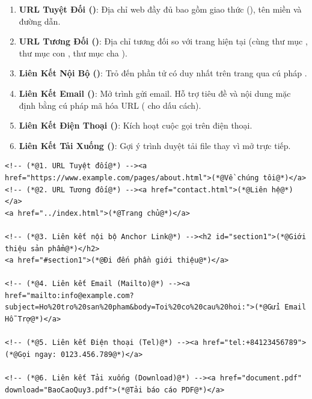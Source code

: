 \begin{enumerate}
    \item \textbf{URL Tuyệt Đối ()}: Địa chỉ web đầy đủ bao gồm giao thức (), tên miền và đường dẫn.
    \item \textbf{URL Tương Đối ()}: Địa chỉ tương đối so với trang hiện tại (cùng thư mục , thư mục con , thư mục cha ).
    \item \textbf{Liên Kết Nội Bộ ()}: Trỏ đến phần tử có  duy nhất trên trang qua cú pháp .
    \item \textbf{Liên Kết Email ()}: Mở trình gửi email. Hỗ trợ tiêu đề và nội dung mặc định bằng cú pháp mã hóa URL ( cho dấu cách).
    \item \textbf{Liên Kết Điện Thoại ()}: Kích hoạt cuộc gọi trên điện thoại.
    \item \textbf{Liên Kết Tải Xuống ()}: Gợi ý trình duyệt tải file thay vì mở trực tiếp.
\end{enumerate}

\begin{codeWindow}
\begin{lstlisting}[language=HTML5]
<!-- (*@1. URL Tuyệt đối@*) --><a href="https://www.example.com/pages/about.html">(*@Về chúng tôi@*)</a>
<!-- (*@2. URL Tương đối@*) --><a href="contact.html">(*@Liên hệ@*)</a>
<a href="../index.html">(*@Trang chủ@*)</a>

<!-- (*@3. Liên kết nội bộ Anchor Link@*) --><h2 id="section1">(*@Giới thiệu sản phẩm@*)</h2>
<a href="#section1">(*@Đi đến phần giới thiệu@*)</a>

<!-- (*@4. Liên kết Email (Mailto)@*) --><a href="mailto:info@example.com?subject=Ho%20tro%20san%20pham&body=Toi%20co%20cau%20hoi:">(*@Gửi Email Hỗ Trợ@*)</a>

<!-- (*@5. Liên kết Điện thoại (Tel)@*) --><a href="tel:+84123456789">(*@Gọi ngay: 0123.456.789@*)</a>

<!-- (*@6. Liên kết Tải xuống (Download)@*) --><a href="document.pdf" download="BaoCaoQuy3.pdf">(*@Tải báo cáo PDF@*)</a>
\end{lstlisting}
\end{codeWindow}

